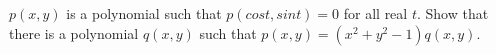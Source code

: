 $p(x,y)$ is a polynomial such that $p(cos t, sin t) = 0$ for all real $t$.
Show that there is a polynomial $q(x,y)$ such that $p(x,y) = (x^2 + y^2 - 1) q(x,y)$.